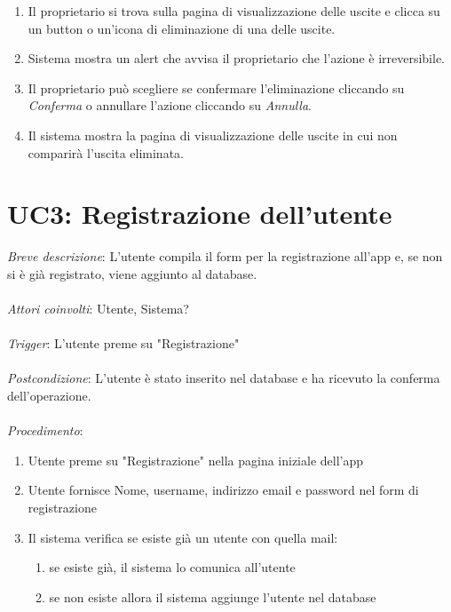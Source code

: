 \begin{enumerate}
    \item Il proprietario si trova sulla pagina di visualizzazione delle uscite e clicca su un button o un'icona di eliminazione di una delle uscite.
    \item Sistema mostra un alert che avvisa il proprietario che l'azione è irreversibile.
    \item Il proprietario può scegliere se confermare l'eliminazione cliccando su \textit{Conferma} o annullare l'azione cliccando su \textit{Annulla}.
    \item Il sistema mostra la pagina di visualizzazione delle uscite in cui non comparirà l'uscita eliminata.
\end{enumerate}

\section{UC3: Registrazione dell'utente}
\emph{Breve descrizione}: L'utente compila il form per la registrazione all'app e, se non si è già registrato, viene aggiunto al database.\\\\
\emph{Attori coinvolti}: Utente, Sistema?\\\\
\emph{Trigger}: L'utente preme su "Registrazione"\\\\
\emph{Postcondizione}: L'utente è stato inserito nel database e ha ricevuto la conferma dell'operazione.\\\\
\emph{Procedimento}:
\begin{enumerate}
    \item Utente preme su "Registrazione" nella pagina iniziale dell'app
    \item Utente fornisce Nome, username, indirizzo email e password nel form di registrazione
    \item Il sistema verifica se esiste già un utente con quella mail:
          \begin{enumerate}
              \item se esiste già, il sistema lo comunica all'utente
              \item se non esiste allora il sistema aggiunge l'utente nel database
          \end{enumerate}
\end{enumerate}

